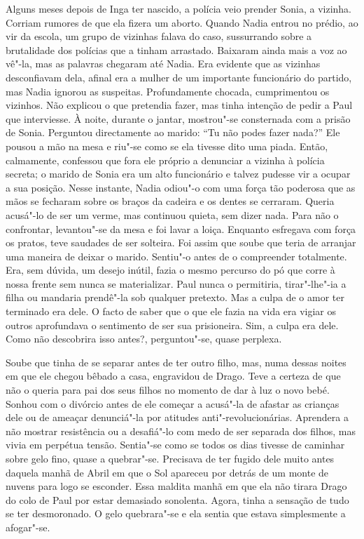 Alguns meses depois de Inga ter nascido, a polícia veio prender Sonia, a
vizinha. Corriam rumores de que ela fizera um aborto. Quando Nadia
entrou no prédio, ao vir da escola, um grupo de vizinhas falava do caso,
sussurrando sobre a brutalidade dos polícias que a tinham arrastado.
Baixaram ainda mais a voz ao vê"-la, mas as palavras chegaram até
Nadia. Era evidente que as vizinhas desconfiavam dela, afinal era a
mulher de um importante funcionário do partido, mas Nadia ignorou as
suspeitas. Profundamente chocada, cumprimentou os vizinhos. Não
explicou o que pretendia fazer, mas tinha intenção de pedir a Paul que
interviesse. À noite, durante o jantar, mostrou"-se consternada com a
prisão de Sonia. Perguntou directamente ao marido: ``Tu não podes fazer
nada?'' Ele pousou a mão na mesa e riu"-se como se ela tivesse dito uma
piada. Então, calmamente, confessou que fora ele próprio a denunciar a
vizinha à polícia secreta; o marido de Sonia era um alto funcionário e
talvez pudesse vir a ocupar a sua posição. Nesse instante, Nadia odiou"-o
com uma força tão poderosa que as mãos se fecharam sobre os braços da
cadeira e os dentes se cerraram. Queria acusá"-lo de ser um verme, mas
continuou quieta, sem dizer nada. Para não o confrontar, levantou"-se da
mesa e foi lavar a loiça. Enquanto esfregava com força os pratos, teve
saudades de ser solteira. Foi assim que soube que teria de arranjar uma
maneira de deixar o marido. Sentiu"-o antes de o compreender totalmente.
Era, sem dúvida, um desejo inútil, fazia o mesmo percurso do pó que
corre à nossa frente sem nunca se materializar. Paul nunca o permitiria,
tirar"-lhe"-ia a filha ou mandaria prendê"-la sob qualquer pretexto. Mas a culpa de o amor ter terminado era
dele. O facto de saber que o que ele fazia na vida era vigiar os outros
aprofundava o sentimento de ser sua prisioneira. Sim, a culpa era dele.
Como não descobrira isso antes?, perguntou"-se, quase perplexa.

Soube que tinha de se separar antes de ter outro filho, mas, numa dessas
noites em que ele chegou bêbado a casa, engravidou de Drago. Teve a
certeza de que não o queria para pai dos seus filhos no momento de dar à
luz o novo bebé. Sonhou com o divórcio antes de ele começar a acusá"-la de afastar as crianças dele ou de ameaçar denunciá"-la por atitudes
anti"-revolucionárias. Aprendera a não mostrar resistência ou a
desafiá"-lo com medo de ser separada dos filhos, mas vivia em perpétua
tensão. Sentia"-se como se todos os dias tivesse de caminhar sobre gelo
fino, quase a quebrar"-se. Precisava de ter fugido dele muito antes
daquela manhã de Abril em que o Sol apareceu por detrás de um monte de
nuvens para logo se esconder. Essa maldita manhã em que ela não tirara
Drago do colo de Paul por estar demasiado sonolenta. Agora, tinha a
sensação de tudo se ter desmoronado. O gelo quebrara"-se e ela sentia que
estava simplesmente a afogar"-se.



